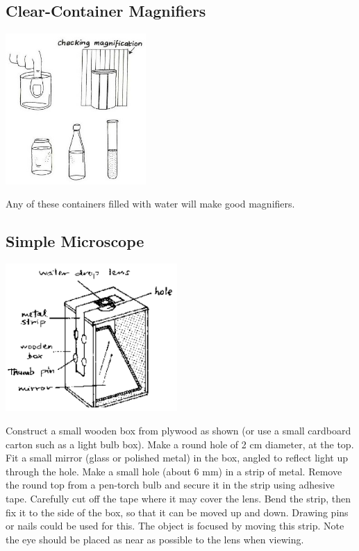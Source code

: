 \begin{multicols}{2}
\subsection{Clear-Container Magnifiers}
\begin{center}
\includegraphics[width=0.4\textwidth]{./img/vso/container-microscope-2.jpg}
\end{center}

Any of these containers filled with water will make good magnifiers.

\subsection{Simple Microscope}
\begin{center}
\includegraphics[width=0.49\textwidth]{./img/source/simple-microscope-2.png}
\end{center}

Construct a small wooden box from plywood as
shown (or use a small cardboard carton such as
a light bulb box). Make a round hole of 2 cm
diameter, at the top. Fit a small mirror (glass or
polished metal) in the box, angled to reflect light
up through the hole. Make a small hole (about 6
mm) in a strip of metal. Remove the round top
from a pen-torch bulb and secure it in the strip
using adhesive tape. Carefully cut off the tape
where it may cover the lens. Bend the strip, then
fix it to the side of the box, so that it can be
moved up and down. Drawing pins or nails
could be used for this. The object is focused by
moving this strip. Note the eye should be placed
as near as possible to the lens when viewing.


\end{multicols}

